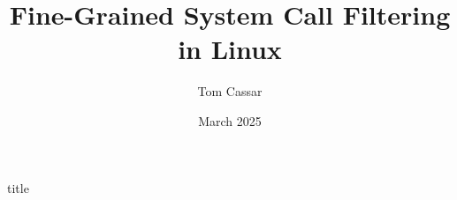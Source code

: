 \documentclass[fontsize=12pt]{report}
\title{Fine-Grained System Call Filtering in Linux}
\author{Tom Cassar}
\date{March 2025}
\begin{document}
{title}
%
%
%
%
%
%
%
\end{document}

